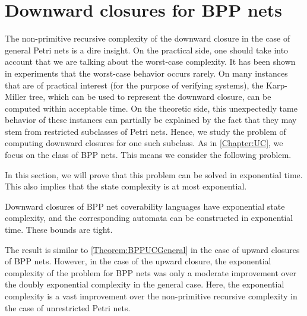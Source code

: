 \documentclass[../../diss.tex]{subfiles}
\begin{document}
\section{Downward closures for BPP nets}%
\label{Section:BPPDC}%

The non-primitive recursive complexity of the downward closure in the case of general Petri nets is a dire insight.
On the practical side, one should take into account that we are talking about the worst-case complexity.
It has been shown in experiments that the worst-case behavior occurs rarely.
On many instances that are of practical interest (\eg for the purpose of verifying systems), the Karp-Miller tree, which can be used to represent the downward closure, can be computed within acceptable time.
On the theoretic side, this unexpectedly tame behavior of these instances can partially be explained by the fact that they may stem from restricted subclasses of Petri nets.
Hence, we study the problem of computing downward closures for one such subclass.
As in \cref{Chapter:UC}, we focus on the class of BPP nets.
This means we consider the following problem.

\begin{compproblem}
    \problemshort{($\BPPDC$)}
\end{compproblem}

In this section, we will prove that this problem can be solved in exponential time.
This also implies that the state complexity is at most exponential.

\begin{theorem}%
\label{Theorem:BPPDCGeneral}%
    Downward closures of BPP net coverability languages have exponential state complexity, and the corresponding automata can be constructed in exponential time. These bounds are tight.
\end{theorem}

The result is similar to \cref{Theorem:BPPUCGeneral} in the case of upward closures of BPP nets.
However, in the case of the upward closure, the exponential complexity of the problem for BPP nets was only a moderate improvement over the doubly exponential complexity in the general case.
Here, the exponential complexity is a vast improvement over the non-primitive recursive complexity in the case of unrestricted Petri nets.
\end{document}
